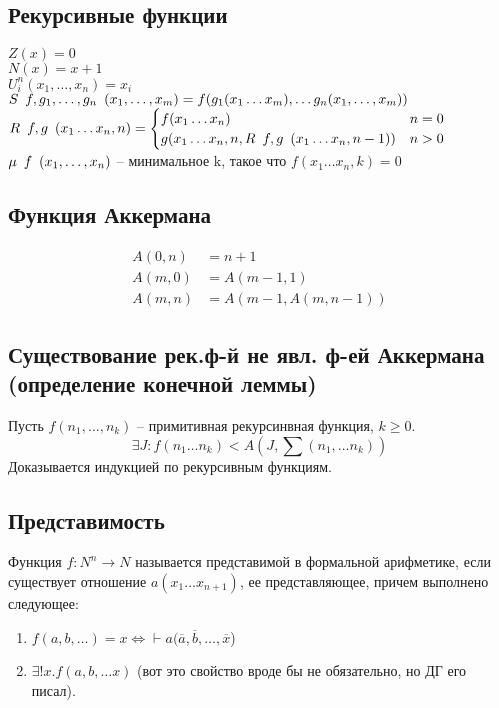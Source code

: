 \subsection{Рекурсивные функции}
\label{sec-2-21}
$Z(x) = 0$\\
$N(x) = x + 1$\\
$U^n_i(x_1,\dotsc, x_n) = x_i$\\
$S\ltemplate f, g_1, \dotsc, g_n\rtemplate (x_1,\dotsc,x_m) = f(g_1(x_1\ldots{}x_m),\ldots{}g_n(x_1,\dotsc,x_m))$\\
$R\ltemplate f, g\rtemplate(x_1\ldots{}x_n, n) = \begin{cases}
    f(x_1\ldots{}x_n) & n = 0 \\
    g(x_1\ldots{}x_n, n, R\ltemplate f, g\rtemplate(x_1\ldots{}x_n, n - 1)) & n > 0
\end{cases}$\\
$\mu\ltemplate f\rtemplate(x_1, \dotsc, x_n)$ -- минимальное k, такое что $f(x_1\ldots{}x_n, k) = 0$
\subsection{Функция Аккермана}
\label{sec-2-22}
\begin{align*}
    A(0, n) &= n + 1 \\
    A(m, 0) &= A(m - 1, 1) \\
    A(m, n) &= A(m - 1, A(m, n - 1))
\end{align*}
\subsection{Существование рек.ф-й не явл. ф-ей Аккермана (определение конечной леммы)}
\label{sec-2-23}
Пусть $f(n_1,\dotsc,n_k)$ -- примитивная рекурсинвная функция, $k \ge 0$.
\[\exists J:f(n_1\ldots{}n_k)<A(J, \sum(n_1,\ldots{}n_k))\]
Доказывается индукцией по рекурсивным функциям.
\subsection{Представимость}
\label{sec-2-24}
Функция $f:N^n\to N$ называется представимой в формальной арифметике, если
существует отношение $a(x_1\ldots{}x_{n+1})$, ее представляющее, причем выполнено
следующее:
\begin{enumerate}
\item $f(a,b,\ldots{}) = x \Leftrightarrow \vdash a(\overline a, \overline b,\dotsc, \overline x$)
\item $\exists !x.f(a,b,\ldots{}x)$ (вот это свойство вроде бы не обязательно, но ДГ его писал).
\end{enumerate}
